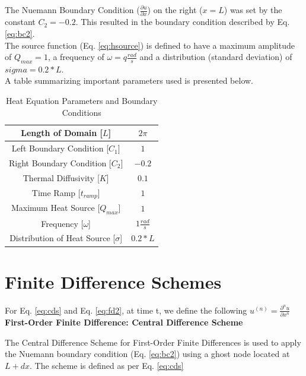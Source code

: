 \documentclass[10pt, letter, showtrims]{extarticle}
\begin{document}
		\noindent
		The Nuemann Boundary Condition ($\frac{\partial u}{\partial x}$) on the right ($x = L$) was set by the constant  $C_{2} = -0.2$. This resulted in the boundary condition described by Eq. \ref{eq:bc2}. \\
		
		\noindent
		The source function (Eq. \ref{eq:hsource}) is defined to have a maximum amplitude of $Q_{max} = 1$, a frequency of $\omega = q \frac{rad}{s}$ and a distribution (standard deviation) of $sigma = 0.2 * L$. \\		
		
		\noindent
		A table summarizing important parameters used is presented below. \\
		
		\FloatBarrier
		\begin{table}[h]
			\caption{Heat Equation Parameters and Boundary Conditions}
			\centering
			\begin{tabular}{|c|c|}
				\hline
				Length of Domain [$L$] & $2\pi$ \\
				\hline
				Left Boundary Condition [$C_{1}$] & $1$ \\
				\hline
				Right Boundary Condition [$C_{2}$] & $-0.2$ \\
				\hline
				Thermal Diffusivity [$K$] & $0.1$ \\
				\hline
				Time Ramp [$t_{ramp}$] & $1$ \\
				\hline
				Maximum Heat Source [$Q_{max}$] & $1$ \\
				\hline
				Frequency [$\omega$] & $1 \frac{rad}{s}$ \\
				\hline
				Distribution of Heat Source [$\sigma$] & $0.2 * L$ \\
				\hline
			\end{tabular}
		\end{table}
		\FloatBarrier
		
		\section{Finite Difference Schemes}
		
		\noindent
		For Eq. \ref{eq:cds} and Eq. \ref{eq:fd2}, at time t, we define the following $u^{(n)} = \frac{\partial^{n} u}{\partial x^{n}}$  \\
		
		\noindent
		\textbf{First-Order Finite Difference: Central Difference Scheme}
		
		\noindent
		The Central Difference Scheme for First-Order Finite Differences is used to apply the Nuemann boundary condition (Eq. \ref{eq:bc2}) using a ghost node located at $L + dx$. The scheme is defined as per Eq. \ref{eq:cds}
		
\end{document}

